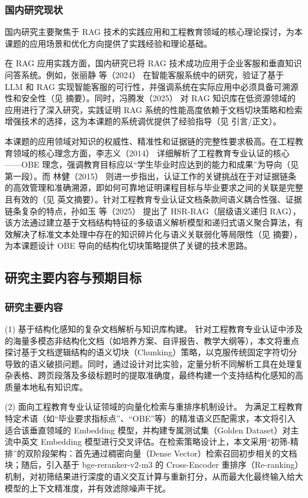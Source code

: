 \documentclass[UTF8,a4paper,zihao=-4]{ctexart}
\begin{document}
\subsubsection{国内研究现状}
国内研究主要聚焦于 RAG 技术的实践应用和工程教育领域的核心理论探讨，为本课题的应用场景和优化方向提供了实践经验和理论基础。

在 RAG 应用实践方面，国内研究已将 RAG 技术成功应用于企业客服和垂直知识问答系统。例如，张丽静 等（2024）\cite{zlj_llmrag_2024} 在智能客服系统中的研究，验证了基于 LLM 和 RAG 实现智能客服的可行性，并强调系统在实际应用中必须具备可溯源性和安全性（见 \cite{zlj_llmrag_2024} 摘要）。同时，冯腾发（2025）\cite{ftf_rag_2025} 对 RAG 知识库在低资源领域的应用进行了深入研究，实践证明 RAG 系统的性能高度依赖于文档切块策略和检索增强技术的选择，这为本课题的系统调优提供了经验指导（见 \cite{ftf_rag_2025} 引言/正文）。

本课题的应用领域对知识的权威性、精准性和证据链的完整性要求极高。在工程教育领域的核心理念方面，李志义（2014）\cite{lzy__2014} 详细解析了工程教育专业认证的核心——OBE 理念，强调教育目标应以“学生毕业时应达到的能力和成果”为导向（见 \cite{lzy__2014} 第一段）。而 林健（2015）\cite{lj__2015} 则进一步指出，认证工作的关键挑战在于对证据链条的高效管理和准确溯源，即如何可靠地证明课程目标与毕业要求之间的关联是完整且有效的（见 \cite{lj__2015} 英文摘要）。针对工程教育专业认证文档条款间语义耦合性强、证据链条复杂的特点，孙如玉 等（2025）\cite{sry_hsr-ragrag_2025} 提出了 HSR-RAG（层级语义递归 RAG），该方法通过建立基于文档结构特征的多级语义解析模型和递归式语义聚合算法，有效解决了标准文本处理中存在的知识碎片化与语义关联弱化等局限性（见 \cite{sry_hsr-ragrag_2025} 摘要），为本课题设计 OBE 导向的结构化切块策略提供了关键的技术思路。

\subsection{研究主要内容与预期目标}
\subsubsection{研究主要内容}
(1) 基于结构化感知的复杂文档解析与知识库构建。 针对工程教育专业认证中涉及的海量多模态非结构化文档（如培养方案、自评报告、教学大纲等），本文将重点探讨基于文档逻辑结构的语义切块（Chunking）策略，以克服传统固定字符切分导致的语义破损问题。同时，通过设计对比实验，定量分析不同解析工具在处理复杂表格、跨页段落及多级标题时的提取准确度，最终构建一个支持结构化感知的高质量本地私有知识库。

(2) 面向工程教育专业认证领域的向量化检索与重排序机制设计。 为满足工程教育特定术语（如“毕业要求指标点”、“OBE”等）的精准语义匹配需求，本文将引入适合该垂直领域的 Embedding 模型，并构建专属测试集（Golden Dataset）对主流中英文 Embedding 模型进行交叉评估。在检索策略设计上，本文采用“初筛-精排”的双阶段架构：首先通过稠密向量（Dense Vector）检索召回初步相关的文档块；随后，引入基于 bge-reranker-v2-m3 的 Cross-Encoder 重排序（Re-ranking）机制，对初筛结果进行深度的语义交互计算与重新打分，从而最大化最终输入给大模型的上下文精准度，并有效滤除噪声干扰。
\end{document}
